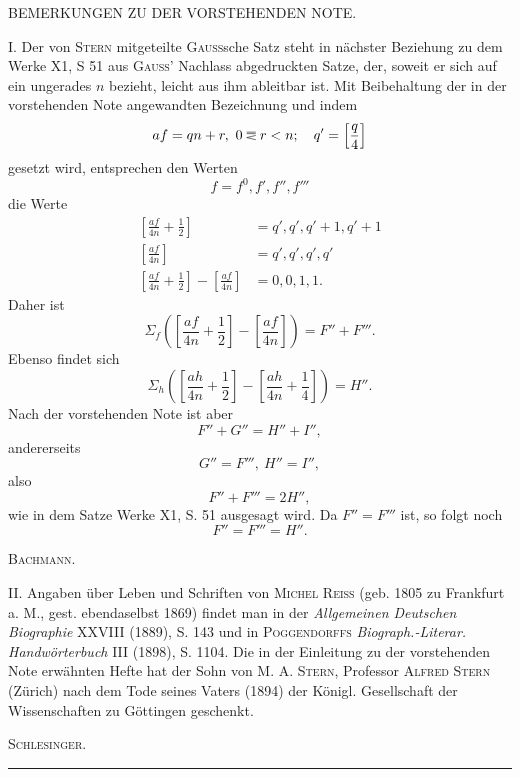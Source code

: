 \begin{center}\small BEMERKUNGEN ZU DER VORSTEHENDEN NOTE.\end{center}
\begingroup\small
\noindent\hspace*{\parindent}I. Der von \textsc{Stern} mitgeteilte \textsc{Gauss}sche Satz steht in nächster Beziehung zu dem Werke X1, S 51 aus \textsc{Gauss}’ Nachlass abgedruckten Satze, der, soweit er sich auf ein ungerades \(n\) bezieht, leicht aus ihm ableitbar ist. Mit Beibehaltung der in der vorstehenden Note angewandten Bezeichnung und indem
\[
af=qn+r,\ 0\EqualAboveLess r<n;\quad q'=\left[\frac q4\right]
\]
gesetzt wird, entsprechen den Werten
\[
f=f^0,f',f'',f'''
\]
die Werte
\[
\begin{aligned}
\left[\frac{af}{4n}+\frac12\right]&=q',q',q'+1,q'+1\\
\left[\frac{af}{4n}\right]&=q',q',q',q'\\
\left[\frac{af}{4n}+\frac12\right]-\left[\frac{af}{4n}\right]&=0,0,1,1.
\end{aligned}
\]
Daher ist
\[
\Sigma_f\left(\left[\frac{af}{4n}+\frac12\right]-\left[\frac{af}{4n}\right]\right)=F''+F'''.
\]
Ebenso findet sich
\[
\Sigma_h\left(\left[\frac{ah}{4n}+\frac12\right]-\left[\frac{ah}{4n}+\frac14\right]\right)=H''.
\]
\newpage{}
\noindent Nach der vorstehenden Note ist aber
\[
F''+G''=H''+I'',
\]
andererseits
\[
G''=F''',\ H''=I'',
\]
also
\[
F''+F'''=2H'',
\]
wie in dem Satze Werke X1, S. 51 ausgesagt wird. Da \(F''=F'''\) ist, so folgt noch
\[
F''=F'''=H''.
\]
\begin{flushright}\textsc{Bachmann.}\end{flushright}

II. Angaben über Leben und Schriften von \textsc{Michel Reiss} (geb. 1805 zu Frankfurt a. M., gest. ebendaselbst 1869) findet man in der \textit{Allgemeinen Deutschen Biographie} XXVIII (1889), S. 143 und in \textsc{Poggendorffs} \textit{Biograph.-Literar. Handwörterbuch} III (1898), S. 1104. Die in der Einleitung zu der vorstehenden Note erwähnten Hefte hat der Sohn von M. A. \textsc{Stern}, Professor \textsc{Alfred Stern} (Zürich) nach dem Tode seines Vaters (1894) der Königl. Gesellschaft der Wissenschaften zu Göttingen geschenkt.
\begin{flushright}\textsc{Schlesinger.}\end{flushright}
\endgroup
\bigskip\begin{center}\rule{.24\textwidth}{.3pt}\end{center}
